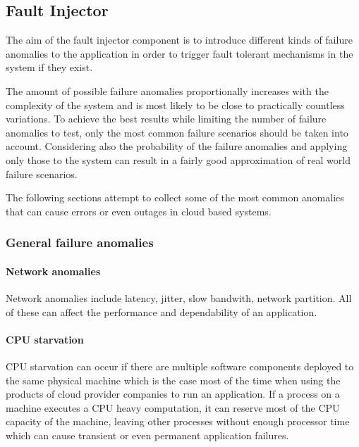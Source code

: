 \subsection{Fault Injector} \label{test-design-fault-injector}


The aim of the fault injector component is to introduce different kinds of failure anomalies to the application in order to trigger fault tolerant mechanisms in the system if they exist.

The amount of possible failure anomalies proportionally increases with the complexity of the system and is most likely to be close to practically countless variations. To achieve the best results while limiting the number of failure anomalies to test, only the most common failure scenarios should be taken into account. Considering also the probability of the failure anomalies and applying only those to the system can result in a fairly good approximation of real world failure scenarios.

The following sections attempt to collect some of the most common anomalies that can cause errors or even outages in cloud based systems.

\subsubsection{General failure anomalies}

\paragraph{Network anomalies} Network anomalies include latency, jitter, slow bandwith, network partition. All of these can affect the performance and dependability of an application.

\paragraph{CPU starvation} CPU starvation can occur if there are multiple software components deployed to the same physical machine which is the case most of the time when using the products of cloud provider companies to run an application. If a process on a machine executes a CPU heavy computation, it can reserve most of the CPU capacity of the machine, leaving other processes without enough processor time which can cause transient or even permanent application failures.

